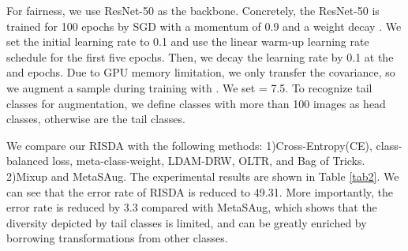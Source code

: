 \documentclass[letterpaper]{article} \usepackage{aaai22}  \usepackage{times}  \usepackage{helvet}  \usepackage{courier}  \usepackage[hyphens]{url}  \usepackage{graphicx} \usepackage{bm}
\begin{document}
For fairness, we use ResNet-50 as the backbone. Concretely, the ResNet-50 is trained for 100 epochs by SGD with a momentum of 0.9 and a weight decay . We set the initial learning rate to 0.1 and use the linear warm-up learning rate schedule for the first five epochs. Then, we decay the learning rate by 0.1 at the  and  epochs.
	Due to GPU memory limitation, we only transfer the covariance, so we augment a sample  during training with . We set  = 7.5. To recognize tail classes for augmentation, we define classes with more than 100 images as head classes, otherwise are the tail classes. 


	
	We compare our RISDA with the following methods: 1)Cross-Entropy(CE), class-balanced loss, meta-class-weight, LDAM-DRW, OLTR, and Bag of Tricks. 2)Mixup and MetaSAug. The experimental results are shown in Table \ref{tab2}. We can see that the error rate of RISDA is reduced to 49.31. More importantly, the error rate is reduced by 3.3 compared with MetaSAug, which shows that the diversity depicted by tail classes is limited, and can be greatly enriched by borrowing transformations from other classes.
	
	
\end{document}
